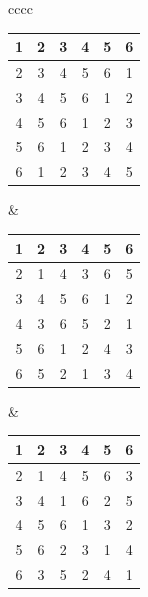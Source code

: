 \begin{center}
\begin{tabular}{cccc}
\begin{tabular}{|c@{\hspace{1.5mm}}|c@{\hspace{1.5mm}}|c@{\hspace{1.5mm}}
|c@{\hspace{1.5mm}}|c@{\hspace{1.5mm}}|c@{\hspace{1.5mm}}|} \hline
1&2&3&4&5&6  \\ \hline
2&3&4&5&6&1  \\ \hline
3&4&5&6&1&2  \\ \hline
4&5&6&1&2&3  \\ \hline
5&6&1&2&3&4  \\ \hline
6&1&2&3&4&5  \\ \hline
\end{tabular}&
\begin{tabular}{|c@{\hspace{1.5mm}}|c@{\hspace{1.5mm}}|c@{\hspace{1.5mm}}
|c@{\hspace{1.5mm}}|c@{\hspace{1.5mm}}|c@{\hspace{1.5mm}}|} \hline
1&2&3&4&5&6  \\ \hline
2&1&4&3&6&5  \\ \hline
3&4&5&6&1&2  \\ \hline
4&3&6&5&2&1  \\ \hline
5&6&1&2&4&3  \\ \hline
6&5&2&1&3&4  \\ \hline
\end{tabular}&
\begin{tabular}{|c@{\hspace{1.5mm}}|c@{\hspace{1.5mm}}|c@{\hspace{1.5mm}}
|c@{\hspace{1.5mm}}|c@{\hspace{1.5mm}}|c@{\hspace{1.5mm}}|} \hline
1&2&3&4&5&6  \\ \hline
2&1&4&5&6&3  \\ \hline
3&4&1&6&2&5  \\ \hline
4&5&6&1&3&2  \\ \hline
5&6&2&3&1&4  \\ \hline
6&3&5&2&4&1  \\ \hline

\end{tabular}
\end{tabular}
\end{center}

